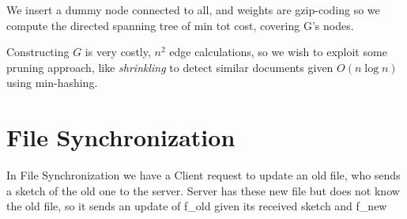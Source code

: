 We insert a dummy node connected to all, and weights are gzip-coding so we 
compute the directed spanning tree of min tot cost, covering G’s nodes.

Constructing $G$ is very costly, $n^2$ edge calculations, so we wish to exploit 
some pruning approach, like \emph{shrinkling} to detect similar documents given 
$O(n \log n)$ using min-hashing.

\section{File Synchronization}
In File Synchronization we have a Client request to update an old file, who sends a sketch of
the old one to the server.\newline
Server has these new file but does not know the old file, so it sends an update of f\_old
given its received sketch and f\_new

